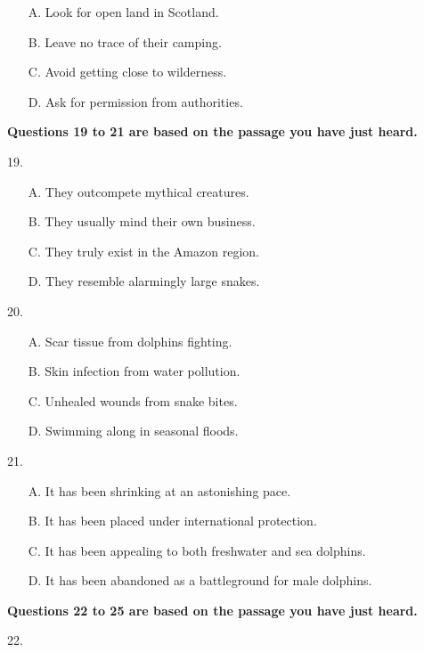 \documentclass[UTF8,11pt]{ctexart}
\begin{document}
\begin{itemize}[leftmargin=2em,itemsep=.2em,topsep=.4em]\item[A.] Look for open land in Scotland.
\item[B.] Leave no trace of their camping.
\item[C.] Avoid getting close to wilderness.
\item[D.] Ask for permission from authorities.
\end{itemize}

\textbf{Questions 19 to 21 are based on the passage you have just heard.}


19.


\begin{itemize}[leftmargin=2em,itemsep=.2em,topsep=.4em]\item[A.] They outcompete mythical creatures.
\item[B.] They usually mind their own business.
\item[C.] They truly exist in the Amazon region.
\item[D.] They resemble alarmingly large snakes.
\end{itemize}

20.


\begin{itemize}[leftmargin=2em,itemsep=.2em,topsep=.4em]\item[A.] Scar tissue from dolphins fighting.
\item[B.] Skin infection from water pollution.
\item[C.] Unhealed wounds from snake bites.
\item[D.] Swimming along in seasonal floods.
\end{itemize}

21.


\begin{itemize}[leftmargin=2em,itemsep=.2em,topsep=.4em]\item[A.] It has been shrinking at an astonishing pace.
\item[B.] It has been placed under international protection.
\item[C.] It has been appealing to both freshwater and sea dolphins.
\item[D.] It has been abandoned as a battleground for male dolphins.
\end{itemize}

\textbf{Questions 22 to 25 are based on the passage you have just heard.}


22.
\end{document}
